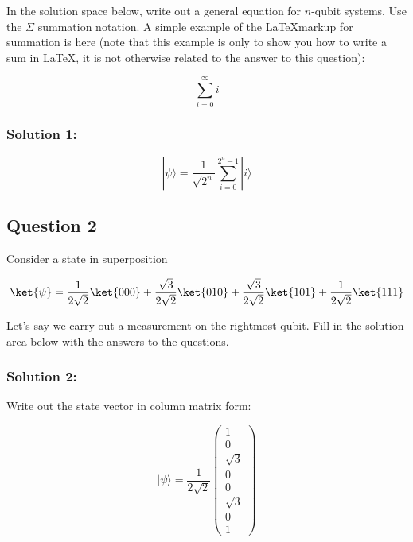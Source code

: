 \documentclass{article}
\begin{document}
In the solution space below, write out a general equation for $n$-qubit systems. Use the $\Sigma$ summation notation. A simple example of the \LaTeX markup for summation is here (note that this example is only to show you how to write a sum in \LaTeX, it is not otherwise related to the answer to this question):

\begin{equation*}
\sum_{i=0}^{\infty} i
\end{equation*}

\subsubsection*{Solution 1:}

\[|\psi\rangle=\frac{1}{\sqrt{2^n}}\sum_{i=0}^{2^n-1}|i\rangle\]

\subsection*{Question 2}

Consider a state in superposition

\begin{equation*}
    \ket{\psi}=
    \frac{1}{2\sqrt{2}} \ket{000} +
    \frac{\sqrt{3}}{2\sqrt{2}} \ket{010} +
    \frac{\sqrt{3}}{2\sqrt{2}} \ket{101} +
    \frac{1}{2\sqrt{2}} \ket{111}
\end{equation*}


Let's say we carry out a measurement on the rightmost qubit. Fill in the solution area below with the answers to the questions.

\subsubsection*{Solution 2:}

Write out the state vector in column matrix form:

\vspace{5mm}

\[|\psi\rangle=\frac{1}{2\sqrt2}\begin{pmatrix}1\\0\\\sqrt3\\0\\0\\\sqrt3\\0\\1\end{pmatrix}\]

\vspace{5mm}
\end{document}
